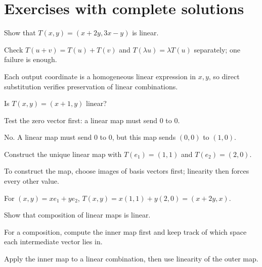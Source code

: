 
\section{Exercises with complete solutions}

\begin{exercise}\label{exr:i05-01}
Show that $T(x,y)=(x+2y,3x-y)$ is linear.
\end{exercise}
\begin{hint}
Check \(T(u+v)=T(u)+T(v)\) and \(T(\lambda u)=\lambda T(u)\) separately; one failure is enough.
\end{hint}
\begin{solution}
Each output coordinate is a homogeneous linear expression in $x,y$, so direct substitution verifies preservation of linear combinations.
\end{solution}

\begin{exercise}\label{exr:i05-02}
Is $T(x,y)=(x+1,y)$ linear?
\end{exercise}
\begin{hint}
Test the zero vector first: a linear map must send \(0\) to \(0\).
\end{hint}
\begin{solution}
No. A linear map must send $0$ to $0$, but this map sends $(0,0)$ to $(1,0)$.
\end{solution}

\begin{exercise}\label{exr:i05-03}
Construct the unique linear map with $T(e_1)=(1,1)$ and $T(e_2)=(2,0)$.
\end{exercise}
\begin{hint}
To construct the map, choose images of basis vectors first; linearity then forces every other value.
\end{hint}
\begin{solution}
For $(x,y)=xe_1+ye_2$, $T(x,y)=x(1,1)+y(2,0)=(x+2y,x)$.
\end{solution}

\begin{exercise}\label{exr:i05-04}
Show that composition of linear maps is linear.
\end{exercise}
\begin{hint}
For a composition, compute the inner map first and keep track of which space each intermediate vector lies in.
\end{hint}
\begin{solution}
Apply the inner map to a linear combination, then use linearity of the outer map.
\end{solution}

